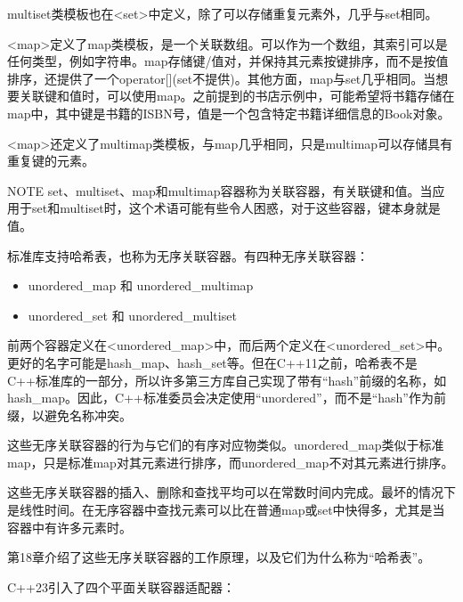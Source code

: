 multiset类模板也在<set>中定义，除了可以存储重复元素外，几乎与set相同。


<map>定义了map类模板，是一个关联数组。可以作为一个数组，其索引可以是任何类型，例如字符串。map存储键/值对，并保持其元素按键排序，而不是按值排序，还提供了一个operator[](set不提供)。其他方面，map与set几乎相同。当想要关联键和值时，可以使用map。之前提到的书店示例中，可能希望将书籍存储在map中，其中键是书籍的ISBN号，值是一个包含特定书籍详细信息的Book对象。


<map>还定义了multimap类模板，与map几乎相同，只是multimap可以存储具有重复键的元素。

\begin{myNotic}{NOTE}
set、multiset、map和multimap容器称为关联容器，有关联键和值。当应用于set和multiset时，这个术语可能有些令人困惑，对于这些容器，键本身就是值。
\end{myNotic}


标准库支持哈希表，也称为无序关联容器。有四种无序关联容器：

\begin{itemize}
\item
unordered\_map 和 unordered\_multimap

\item
unordered\_set 和 unordered\_multiset
\end{itemize}

前两个容器定义在<unordered\_map>中，而后两个定义在<unordered\_set>中。更好的名字可能是hash\_map、hash\_set等。但在C++11之前，哈希表不是C++标准库的一部分，所以许多第三方库自己实现了带有“hash”前缀的名称，如hash\_map。因此，C++标准委员会决定使用“unordered”，而不是“hash”作为前缀，以避免名称冲突。

这些无序关联容器的行为与它们的有序对应物类似。unordered\_map类似于标准map，只是标准map对其元素进行排序，而unordered\_map不对其元素进行排序。

这些无序关联容器的插入、删除和查找平均可以在常数时间内完成。最坏的情况下是线性时间。在无序容器中查找元素可以比在普通map或set中快得多，尤其是当容器中有许多元素时。

第18章介绍了这些无序关联容器的工作原理，以及它们为什么称为“哈希表”。



C++23引入了四个平面关联容器适配器：


